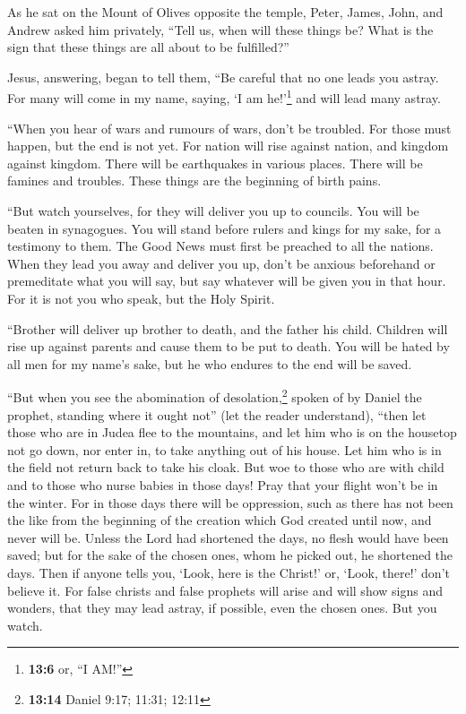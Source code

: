  As he sat on the Mount of Olives opposite the temple,
Peter, James, John, and Andrew asked him privately, 
``Tell us, when will these things be? What is the sign that these things
are all about to be fulfilled?''

 Jesus, answering, began to tell them, ``Be careful that
no one leads you astray.  For many will come in my name,
saying, `I am he!'\footnote{\textbf{13:6} or, ``I AM!''} and will lead
many astray.

 ``When you hear of wars and rumours of wars, don't be
troubled. For those must happen, but the end is not yet. 
For nation will rise against nation, and kingdom against kingdom. There
will be earthquakes in various places. There will be famines and
troubles. These things are the beginning of birth pains.

 ``But watch yourselves, for they will deliver you up to
councils. You will be beaten in synagogues. You will stand before rulers
and kings for my sake, for a testimony to them.  The Good
News must first be preached to all the nations.  When
they lead you away and deliver you up, don't be anxious beforehand or
premeditate what you will say, but say whatever will be given you in
that hour. For it is not you who speak, but the Holy Spirit.

 ``Brother will deliver up brother to death, and the
father his child. Children will rise up against parents and cause them
to be put to death.  You will be hated by all men for my
name's sake, but he who endures to the end will be saved.

 ``But when you see the abomination of
desolation,\footnote{\textbf{13:14} Daniel 9:17; 11:31; 12:11} spoken of
by Daniel the prophet, standing where it ought not'' (let the reader
understand), ``then let those who are in Judea flee to the mountains,
 and let him who is on the housetop not go down, nor
enter in, to take anything out of his house.  Let him who
is in the field not return back to take his cloak.  But
woe to those who are with child and to those who nurse babies in those
days!  Pray that your flight won't be in the winter.
 For in those days there will be oppression, such as
there has not been the like from the beginning of the creation which God
created until now, and never will be.  Unless the Lord
had shortened the days, no flesh would have been saved; but for the sake
of the chosen ones, whom he picked out, he shortened the days.
 Then if anyone tells you, `Look, here is the Christ!'
or, `Look, there!' don't believe it.  For false christs
and false prophets will arise and will show signs and wonders, that they
may lead astray, if possible, even the chosen ones.  But
you watch.

